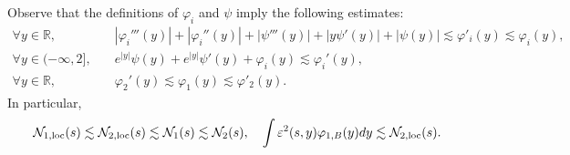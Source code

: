 \documentclass[11pt,a4paper,reqno]{amsart}
\theoremstyle{remark}
\numberwithin{equation}{section}
\newcommand{\be}{\begin{equation}}
\newcommand{\ee}{\end{equation}}
\def\RR{\mathbb{R}}
\def\RR{\mathbb{R}}
\begin{document}
Observe that the  definitions of $\varphi_i$ and $\psi$ imply the following estimates:
\begin{align} \label{defphi4}
    \forall y\in \RR, \quad  &|\varphi_i'''(y) | + | \varphi_i''(y) |+|\psi'''(y)|+|y\psi'(y)|+|\psi(y)|
   \lesssim  \varphi'_i(y)\lesssim \varphi_i(y),\\
   \forall y\in (-\infty,2], \quad 
  \label{defphi4bis}
  &    e^{ |y|} \psi(y)  + e^{  |y|} \psi'(y) +\varphi_i(y)\lesssim \varphi_i'(y),\\
  \forall y\in \RR, \quad  &
  \varphi_2'(y)\lesssim \varphi_1(y) \lesssim \varphi'_2(y). \label{defphi4tri}
\end{align}
In particular,
\be\label{locpasloc}
{\mathcal{N}_{1,\rm loc}} (s) \lesssim{\mathcal{N}_{2,\rm loc}} (s) \lesssim  {\mathcal{N}_{1}} (s)\lesssim {\mathcal{N}_2} (s),\quad
\int\varepsilon^2 (s,y)     \varphi_{1,B} (y) dy\lesssim {\mathcal{N}_{2,\rm loc}} (s) .
\ee
\end{document}
